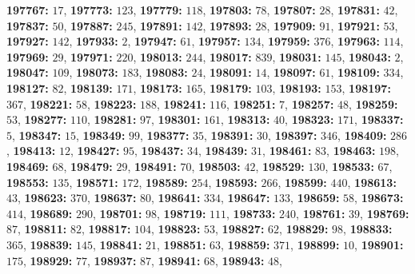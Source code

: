 \textsf{\bfseries 197767:} $17$, \textsf{\bfseries 197773:} $123$, \textsf{\bfseries 197779:} $118$, \textsf{\bfseries 197803:} $78$, \textsf{\bfseries 197807:} $28$, \textsf{\bfseries 197831:} $42$, \textsf{\bfseries 197837:} $50$, \textsf{\bfseries 197887:} $245$, \textsf{\bfseries 197891:} $142$, \textsf{\bfseries 197893:} $28$, \textsf{\bfseries 197909:} $91$, \textsf{\bfseries 197921:} $53$, \textsf{\bfseries 197927:} $142$, \textsf{\bfseries 197933:} $2$, \textsf{\bfseries 197947:} $61$, \textsf{\bfseries 197957:} $134$, \textsf{\bfseries 197959:} $376$, \textsf{\bfseries 197963:} $114$, \textsf{\bfseries 197969:} $29$, \textsf{\bfseries 197971:} $220$, \textsf{\bfseries 198013:} $244$, \textsf{\bfseries 198017:} $839$, \textsf{\bfseries 198031:} $145$, \textsf{\bfseries 198043:} $2$, \textsf{\bfseries 198047:} $109$, \textsf{\bfseries 198073:} $183$, \textsf{\bfseries 198083:} $24$, \textsf{\bfseries 198091:} $14$, \textsf{\bfseries 198097:} $61$, \textsf{\bfseries 198109:} $334$, \textsf{\bfseries 198127:} $82$, \textsf{\bfseries 198139:} $171$, \textsf{\bfseries 198173:} $165$, \textsf{\bfseries 198179:} $103$, \textsf{\bfseries 198193:} $153$, \textsf{\bfseries 198197:} $367$, \textsf{\bfseries 198221:} $58$, \textsf{\bfseries 198223:} $188$, \textsf{\bfseries 198241:} $116$, \textsf{\bfseries 198251:} $7$, \textsf{\bfseries 198257:} $48$, \textsf{\bfseries 198259:} $53$, \textsf{\bfseries 198277:} $110$, \textsf{\bfseries 198281:} $97$, \textsf{\bfseries 198301:} $161$, \textsf{\bfseries 198313:} $40$, \textsf{\bfseries 198323:} $171$, \textsf{\bfseries 198337:} $5$, \textsf{\bfseries 198347:} $15$, \textsf{\bfseries 198349:} $99$, \textsf{\bfseries 198377:} $35$, \textsf{\bfseries 198391:} $30$, \textsf{\bfseries 198397:} $346$, \textsf{\bfseries 198409:} $286$, \textsf{\bfseries 198413:} $12$, \textsf{\bfseries 198427:} $95$, \textsf{\bfseries 198437:} $34$, \textsf{\bfseries 198439:} $31$, \textsf{\bfseries 198461:} $83$, \textsf{\bfseries 198463:} $198$, \textsf{\bfseries 198469:} $68$, \textsf{\bfseries 198479:} $29$, \textsf{\bfseries 198491:} $70$, \textsf{\bfseries 198503:} $42$, \textsf{\bfseries 198529:} $130$, \textsf{\bfseries 198533:} $67$, \textsf{\bfseries 198553:} $135$, \textsf{\bfseries 198571:} $172$, \textsf{\bfseries 198589:} $254$, \textsf{\bfseries 198593:} $266$, \textsf{\bfseries 198599:} $440$, \textsf{\bfseries 198613:} $43$, \textsf{\bfseries 198623:} $370$, \textsf{\bfseries 198637:} $80$, \textsf{\bfseries 198641:} $334$, \textsf{\bfseries 198647:} $133$, \textsf{\bfseries 198659:} $58$, \textsf{\bfseries 198673:} $414$, \textsf{\bfseries 198689:} $290$, \textsf{\bfseries 198701:} $98$, \textsf{\bfseries 198719:} $111$, \textsf{\bfseries 198733:} $240$, \textsf{\bfseries 198761:} $39$, \textsf{\bfseries 198769:} $87$, \textsf{\bfseries 198811:} $82$, \textsf{\bfseries 198817:} $104$, \textsf{\bfseries 198823:} $53$, \textsf{\bfseries 198827:} $62$, \textsf{\bfseries 198829:} $98$, \textsf{\bfseries 198833:} $365$, \textsf{\bfseries 198839:} $145$, \textsf{\bfseries 198841:} $21$, \textsf{\bfseries 198851:} $63$, \textsf{\bfseries 198859:} $371$, \textsf{\bfseries 198899:} $10$, \textsf{\bfseries 198901:} $175$, \textsf{\bfseries 198929:} $77$, \textsf{\bfseries 198937:} $87$, \textsf{\bfseries 198941:} $68$, \textsf{\bfseries 198943:} $48$, 
